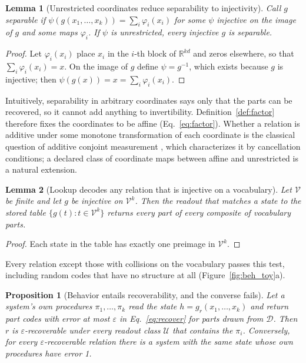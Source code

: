 \documentclass[10pt]{article}
\theoremstyle{plain}
\newtheorem{proposition}{Proposition}
\newtheorem{lemma}{Lemma}
\theoremstyle{remark}
\newcommand{\R}{\mathbb{R}}
\newcommand{\U}{\mathcal{U}}
\newcommand{\D}{\mathcal{D}}
\newcommand{\Voc}{\mathcal{V}}
\begin{document}
\begin{lemma}[Unrestricted coordinates reduce separability to injectivity]
\label{lem:psi}
Call $g$ separable if $\psi(g(x_1, \ldots, x_k)) = \sum_i \varphi_i(x_i)$ for some $\psi$ injective on the image of $g$ and some maps $\varphi_i$. If $\psi$ is unrestricted, every injective $g$ is separable.
\end{lemma}

\begin{proof}
Let $\varphi_i(x_i)$ place $x_i$ in the $i$-th block of $\R^{kd}$ and zeros elsewhere, so that $\sum_i \varphi_i(x_i) = x$. On the image of $g$ define $\psi = g^{-1}$, which exists because $g$ is injective; then $\psi(g(x)) = x = \sum_i \varphi_i(x_i)$.
\end{proof}

\noindent
Intuitively, separability in arbitrary coordinates says only that the parts can be recovered, so it cannot add anything to invertibility. Definition~\ref{def:factor} therefore fixes the coordinates to be affine (Eq.~\ref{eq:factor}). Whether a relation is additive under some monotone transformation of each coordinate is the classical question of additive conjoint measurement \citep{luce1964}, which characterizes it by cancellation conditions; a declared class of coordinate maps between affine and unrestricted is a natural extension.

\begin{lemma}[Lookup decodes any relation that is injective on a vocabulary]
\label{lem:lookup}
Let $\Voc$ be finite and let $g$ be injective on $\Voc^k$. Then the readout that matches a state to the stored table $\{g(t) : t \in \Voc^k\}$ returns every part of every composite of vocabulary parts.
\end{lemma}

\begin{proof}
Each state in the table has exactly one preimage in $\Voc^k$.
\end{proof}

\noindent
Every relation except those with collisions on the vocabulary passes this test, including random codes that have no structure at all (Figure~\ref{fig:beh_toy}a).



\begin{proposition}[Behavior entails recoverability, and the converse fails]
\label{prop:subset}
Let a system's own procedures $\pi_1, \ldots, \pi_k$ read the state $h = g_r(x_1, \ldots, x_k)$ and return part codes with error at most $\varepsilon$ in Eq.~\eqref{eq:recover} for parts drawn from $\D$. Then $r$ is $\varepsilon$-recoverable under every readout class $\U$ that contains the $\pi_i$. Conversely, for every $\varepsilon$-recoverable relation there is a system with the same state whose own procedures have error 1.
\end{proposition}
\end{document}
